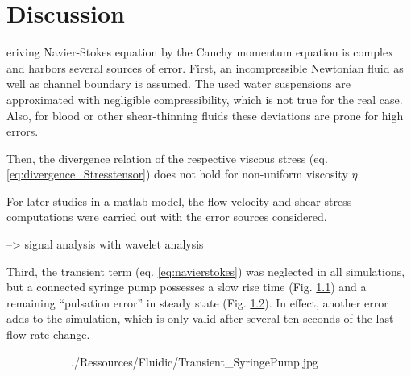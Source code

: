 \chapter{Discussion}
eriving Navier-Stokes equation by the Cauchy momentum equation is complex and harbors several sources of error. First, an incompressible Newtonian fluid as well as channel boundary is assumed. The used water suspensions are approximated with negligible compressibility, which is not true for the real case. Also, for blood or other shear-thinning fluids these deviations are prone for high errors.  

Then, the divergence relation of the respective viscous stress (eq. \ref{eq:divergence_Stresstensor}) does not hold for non-uniform viscosity $\eta$.

For later studies in a matlab model, the flow velocity and shear stress computations were carried out with the error sources considered. 


--> signal analysis with wavelet analysis

Third, the transient term (eq. \ref{eq:navierstokes}) was neglected in all simulations, but a connected syringe pump possesses a slow rise time (Fig. \ref{fig:fluidic:pumpStability:transient}) and a remaining ``pulsation error'' in steady state (Fig. \ref{fig:fluidic:pumpStability:steadystate}). In effect, another error adds to the simulation, which is only valid after several ten seconds of the last flow rate change.
\begin{figure}
	\begin{subfigure}[b]{0.5\textwidth}
		\centering
		\addtocounter{subfigure}{1}  
		 {./Ressources/Fluidic/Transient_SyringePump.jpg}		
		\addtocounter{subfigure}{-1}  
		\label{fig:fluidic:pumpStability:transient}
	\end{subfigure}%
	\begin{subfigure}[b]{0.5\textwidth}
		\centering
		\addtocounter{subfigure}{1}  
		\addtocounter{subfigure}{-1}  
		\label{fig:fluidic:pumpStability:steadystate}
	\end{subfigure}
	\label{fig:fluidic:pumpStability}
\end{figure}


